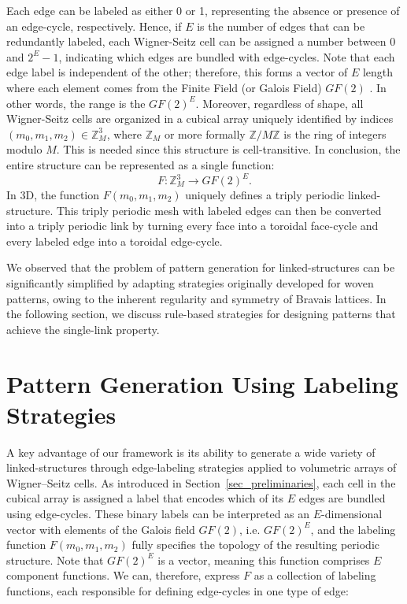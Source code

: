 \documentclass[times,twocolumn,final]{elsarticle}
\newcommand{\ergun}[1]{{\color{red} #1}}
\begin{document}
Each edge can be labeled as either 0 or 1, representing the absence or presence of an edge-cycle, respectively. Hence, if $E$ is the number of edges that can be redundantly labeled, each Wigner-Seitz cell can be assigned a number between $0$ and $2^E - 1$, indicating which edges are bundled with edge-cycles. Note that each edge label is independent of the other; therefore, this forms a vector of $E$ length where each element comes from the Finite Field (or Galois Field) $GF(2)$ \cite{lidl1997finite}. In other words, the range is the $GF(2)^E$. Moreover, regardless of shape, all Wigner-Seitz cells are organized in a cubical array uniquely identified by indices \ergun{ $(m_0, m_1, m_2) \in \mathbb{Z}_M^3$, where $\mathbb{Z}_M$ or more formally $\mathbb{Z}/M\mathbb{Z}$ is the ring of integers modulo $M$. This is needed since this structure is cell-transitive. In conclusion, the entire structure can be represented as a single function:
\[
F: \mathbb{Z}_M^3 \rightarrow GF(2)^E.
\]
}
In 3D, the function $F(m_0, m_1, m_2)$ uniquely defines a triply periodic linked-structure. This triply periodic mesh with labeled edges can then be converted into a triply periodic link by turning every face into a \ergun{toroidal} face-cycle and every labeled edge into a \ergun{toroidal} edge-cycle.

We observed that the problem of pattern generation for linked-structures can be significantly simplified by adapting strategies originally developed for woven patterns, owing to the inherent regularity and symmetry of Bravais lattices. In the following section, we discuss rule-based strategies for designing patterns that achieve the single-link property.


\section{Pattern Generation Using Labeling Strategies}

A key advantage of our framework is its ability to generate a wide variety of linked-structures through edge-labeling strategies applied to volumetric arrays of Wigner–Seitz cells. As introduced in Section~\ref{sec_preliminaries}, each cell in the cubical array is assigned a label that encodes which of its $E$ edges are bundled using edge-cycles. These binary labels can be interpreted as an $E$-dimensional vector with elements of the Galois field $GF(2)$, i.e. $GF(2)^E$, and the labeling function 
$F(m_0, m_1, m_2)$
fully specifies the topology of the resulting periodic structure. Note that $GF(2)^E$ is a vector, meaning this function comprises $E$ component functions. We can, therefore, express $F$ as a collection of labeling functions, each responsible for defining edge-cycles in one type of edge:
\end{document}
